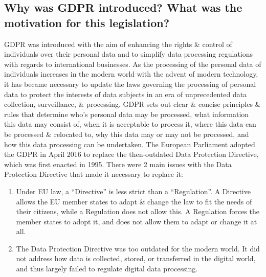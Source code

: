\documentclass[a4paper]{article}
\begin{document}
\subsection{Why was GDPR introduced? What was the motivation for this legislation?}
GDPR was introduced with the aim of enhancing the rights \& control of individuals over their personal data and to simplify data processing regulations with regards to international businesses.
\bigbreak
As the processing of the personal data of individuals increases in the modern world with the advent of modern technology, it has became necessary to update the laws governing the processing of personal data to protect the interests of data subjects in an era of unprecedented data collection, surveillance, \& processing. GDPR sets out clear \& concise principles \& rules that determine who's personal data may be processed, what information this data may consist of, when it is acceptable to process it, where this data can be processed \& relocated to, why this data may or may not be processed, and how this data processing can be undertaken.   
\bigbreak
The European Parliament adopted the GDPR in April 2016 to replace the then-outdated Data Protection Directive, which was first enacted in 1995.
There were 2 main issues with the Data Protection Directive that made it necessary to replace it:
\begin{enumerate}
    \item Under EU law, a ``Directive'' is less strict than a ``Regulation''.
        A Directive allows the EU member states to adapt \& change the law to fit the needs of their citizens, while a Regulation does not allow this.
        A Regulation forces the member states to adopt it, and does not allow them to adapt or change it at all.
    \item The Data Protection Directive was too outdated for the modern world.
        It did not address how data is collected, stored, or transferred in the digital world, and thus largely failed to regulate digital data processing.
\end{enumerate}

\bigskip

\end{document}
